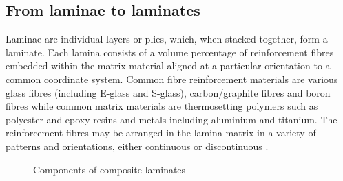 \subsection{From laminae to laminates}

Laminae are individual layers or plies, which, when stacked together, form a laminate. Each lamina consists of a volume percentage of reinforcement fibres embedded within the matrix material aligned at a particular orientation to a common coordinate system. Common fibre reinforcement materials are various glass fibres (including E-glass and S-glass), carbon/graphite fibres and boron fibres while common matrix materials are thermosetting polymers such as polyester and epoxy resins and metals including aluminium and titanium. The reinforcement fibres may be arranged in the lamina matrix in a variety of patterns and orientations, either continuous or discontinuous \cite{agarwal2006analysis}. 
\begin{figure}[H]
	\caption{\label{composite_laminates}Components of composite laminates \cite{reddy2004mechanics}}
\end{figure}

